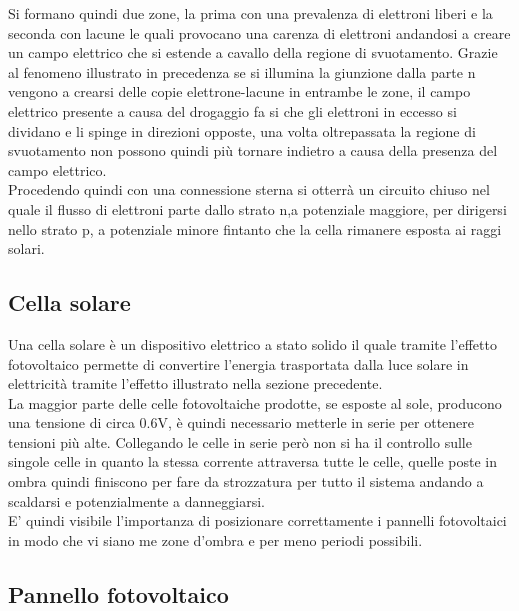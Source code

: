 Si formano quindi due zone, la prima con una prevalenza di elettroni liberi e la seconda con lacune le quali provocano una carenza di elettroni andandosi a creare un campo elettrico che si estende a cavallo della regione di svuotamento.
Grazie al fenomeno illustrato in precedenza se si illumina la giunzione dalla parte n vengono a crearsi delle copie elettrone-lacune in entrambe le zone, il campo elettrico presente a causa del drogaggio fa si che gli elettroni in eccesso si dividano e li spinge in direzioni opposte, una volta oltrepassata la regione di svuotamento non possono quindi più tornare indietro a causa della presenza del campo elettrico.\\
Procedendo quindi con una connessione sterna si otterrà un circuito chiuso nel quale il flusso di elettroni parte dallo strato n,a potenziale maggiore, per dirigersi nello strato p, a potenziale minore fintanto che la cella rimanere esposta ai raggi solari.\\
\subsection{Cella solare}
Una cella solare è un dispositivo elettrico a stato solido il quale tramite l'effetto fotovoltaico permette di convertire l'energia trasportata dalla luce solare in elettricità tramite l'effetto illustrato nella sezione precedente.\\
La maggior parte delle celle fotovoltaiche prodotte, se esposte al sole, producono una tensione di circa 0.6V, è quindi necessario metterle in serie per ottenere tensioni più alte.
Collegando le celle in serie però non si ha il controllo sulle singole celle in quanto la stessa corrente attraversa tutte le celle, quelle poste in ombra quindi finiscono per fare da strozzatura per tutto il sistema andando a scaldarsi e potenzialmente a danneggiarsi.\\
E' quindi visibile l'importanza di posizionare correttamente i pannelli fotovoltaici in modo che vi siano me zone d'ombra e per meno periodi possibili.\\
\subsection{Pannello fotovoltaico}
